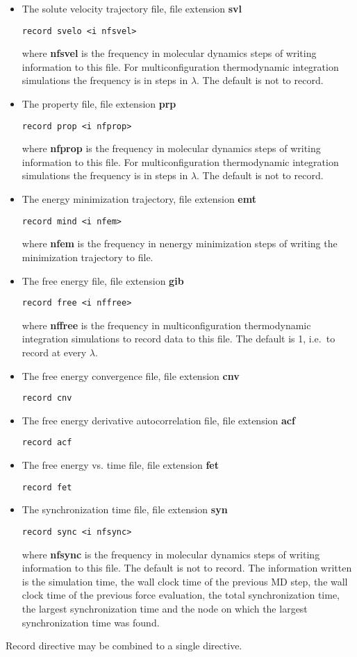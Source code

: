 \begin{itemize}
\item
The solute velocity trajectory file, file extension {\bf svl}
\begin{verbatim}
record svelo <i nfsvel>
\end{verbatim}
where {\bf nfsvel} is the frequency in molecular dynamics steps
of writing information to this file. For multiconfiguration
thermodynamic integration simulations the frequency is in
steps in $\lambda$. The default is not to record.
\item
The property file, file extension {\bf prp}
\begin{verbatim}
record prop <i nfprop>
\end{verbatim}
where {\bf nfprop} is the frequency in molecular dynamics steps
of writing information to this file. For multiconfiguration
thermodynamic integration simulations the frequency is in
steps in $\lambda$. The default is not to record.
\item
The energy minimization trajectory, file extension {\bf emt}
\begin{verbatim}
record mind <i nfem>
\end{verbatim}
where {\bf nfem} is the frequency in nenergy minimization steps of
writing the minimization trajectory to file.
\item
The free energy file, file extension {\bf gib}
\begin{verbatim}
record free <i nffree>
\end{verbatim}
where {\bf nffree} is the frequency in multiconfiguration
thermodynamic integration simulations to record data to this file.
The default is 1, i.e.\ to record at every $\lambda$.
\item
The free energy convergence file, file extension {\bf cnv}
\begin{verbatim}
record cnv
\end{verbatim}
\item
The free energy derivative autocorrelation file, file extension {\bf acf}
\begin{verbatim}
record acf
\end{verbatim}
\item
The free energy vs. time file, file extension {\bf fet}
\begin{verbatim}
record fet
\end{verbatim}
\item
The synchronization time file, file extension {\bf syn}
\begin{verbatim}
record sync <i nfsync>
\end{verbatim}
where {\bf nfsync} is the frequency in molecular dynamics steps
of writing information to this file. The default is not to record.
The information written is the simulation time, the wall clock time
of the previous MD step, the wall clock time of the previous force
evaluation, the total synchronization time, the largest
synchronization time and the node on which the largest synchronization
time was found.
\end{itemize}
Record directive may be combined to a single directive.

